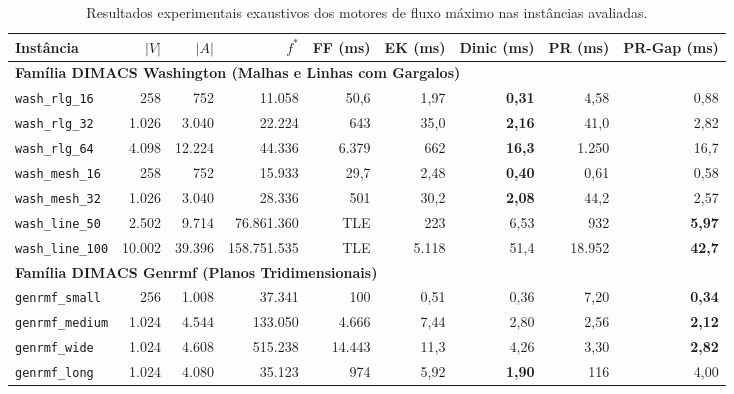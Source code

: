\begin{table}[!ht]
\centering
\footnotesize
\setlength{\tabcolsep}{3pt}
\begin{tabular}{lrrrrrrrr}
\toprule
\textbf{Instância} & $|V|$ & $|A|$ & $f^*$ & \textbf{FF (ms)} & \textbf{EK (ms)} & \textbf{Dinic (ms)} & \textbf{PR (ms)} & \textbf{PR-Gap (ms)} \\
\midrule
\multicolumn{9}{l}{\textbf{Família DIMACS Washington (Malhas e Linhas com Gargalos)}} \\
\midrule
\texttt{wash\_rlg\_16} & 258 & 752 & 11.058 & 50,6 & 1,97 & \textbf{0,31} & 4,58 & 0,88 \\
\texttt{wash\_rlg\_32} & 1.026 & 3.040 & 22.224 & 643 & 35,0 & \textbf{2,16} & 41,0 & 2,82 \\
\texttt{wash\_rlg\_64} & 4.098 & 12.224 & 44.336 & 6.379 & 662 & \textbf{16,3} & 1.250 & 16,7 \\
\texttt{wash\_mesh\_16} & 258 & 752 & 15.933 & 29,7 & 2,48 & \textbf{0,40} & 0,61 & 0,58 \\
\texttt{wash\_mesh\_32} & 1.026 & 3.040 & 28.336 & 501 & 30,2 & \textbf{2,08} & 44,2 & 2,57 \\
\texttt{wash\_line\_50} & 2.502 & 9.714 & 76.861.360 & TLE & 223 & 6,53 & 932 & \textbf{5,97} \\
\texttt{wash\_line\_100} & 10.002 & 39.396 & 158.751.535 & TLE & 5.118 & 51,4 & 18.952 & \textbf{42,7} \\
\midrule
\multicolumn{9}{l}{\textbf{Família DIMACS Genrmf (Planos Tridimensionais)}} \\
\midrule
\texttt{genrmf\_small} & 256 & 1.008 & 37.341 & 100 & 0,51 & 0,36 & 7,20 & \textbf{0,34} \\
\texttt{genrmf\_medium} & 1.024 & 4.544 & 133.050 & 4.666 & 7,44 & 2,80 & 2,56 & \textbf{2,12} \\
\texttt{genrmf\_wide} & 1.024 & 4.608 & 515.238 & 14.443 & 11,3 & 4,26 & 3,30 & \textbf{2,82} \\
\texttt{genrmf\_long} & 1.024 & 4.080 & 35.123 & 974 & 5,92 & \textbf{1,90} & 116 & 4,00 \\
\bottomrule
\end{tabular}
\caption{Resultados experimentais exaustivos dos motores de fluxo máximo nas instâncias avaliadas.}
\label{tab:benchmarks_maxflow_exhaustive}
\end{table}
